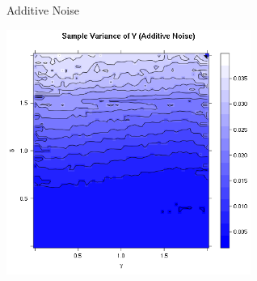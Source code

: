 \begin{frame}{Additive Noise}
\begin{center}
	\includegraphics[width=8cm]{img/sampleVarianceYAdditiveNoise} 
\end{center}
\end{frame}

